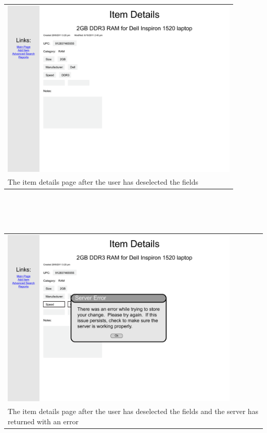 \documentclass{article}
\begin{document}
\begin{tabular}{ p{4.5in} }
\includegraphics[keepaspectratio, width=4.5in]{modifyDetailsF0S4.pdf} \\
The item details page after the user has deselected the fields
\end{tabular}\\
~\\
~\\
\begin{tabular}{ p{4.5in} }
\includegraphics[keepaspectratio, width=4.5in]{modifyDetailsF1S4.pdf} \\
The item details page after the user has deselected the fields and the server has returned with an error
\end{tabular}\\
~\\
~\\
\end{document}

